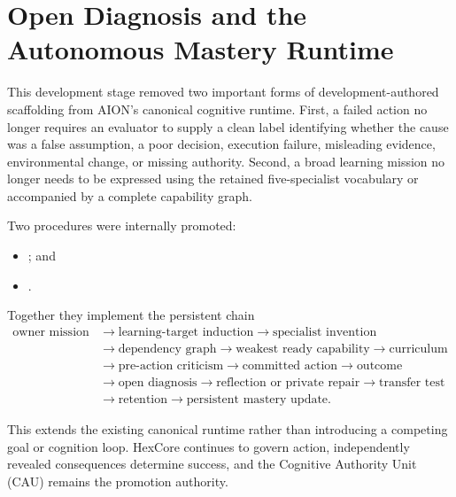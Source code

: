 
\section{Open Diagnosis and the Autonomous Mastery Runtime}
\label{sec:aion-autonomous-mastery-runtime}

This development stage removed two important forms of development-authored
scaffolding from AION's canonical cognitive runtime.  First, a failed action no
longer requires an evaluator to supply a clean label identifying whether the
cause was a false assumption, a poor decision, execution failure, misleading
evidence, environmental change, or missing authority.  Second, a broad learning
mission no longer needs to be expressed using the retained five-specialist
vocabulary or accompanied by a complete capability graph.

Two procedures were internally promoted:
\begin{itemize}
    \item {}; and
    \item {}.
\end{itemize}
Together they implement the persistent chain
\begin{equation}
\begin{aligned}
\text{owner mission}
&\rightarrow \text{learning-target induction}
\rightarrow \text{specialist invention} \\
&\rightarrow \text{dependency graph}
\rightarrow \text{weakest ready capability}
\rightarrow \text{curriculum} \\
&\rightarrow \text{pre-action criticism}
\rightarrow \text{committed action}
\rightarrow \text{outcome} \\
&\rightarrow \text{open diagnosis}
\rightarrow \text{reflection or private repair}
\rightarrow \text{transfer test} \\
&\rightarrow \text{retention}
\rightarrow \text{persistent mastery update}.
\end{aligned}
\label{eq:autonomous-mastery-loop}
\end{equation}

This extends the existing canonical runtime rather than introducing a competing
goal or cognition loop.  HexCore continues to govern action, independently
revealed consequences determine success, and the Cognitive Authority Unit
(CAU) remains the promotion authority.

